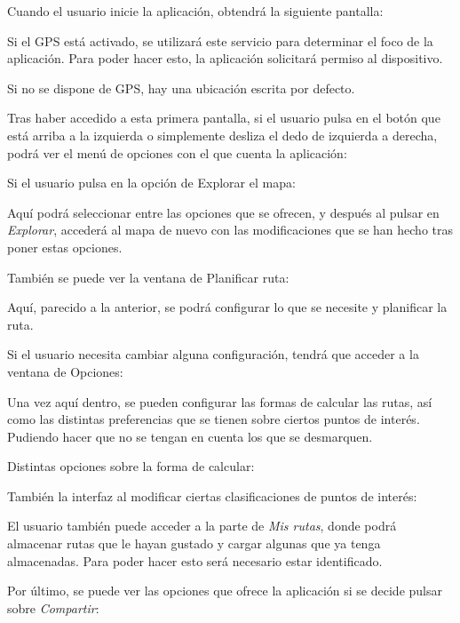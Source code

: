 Cuando el usuario inicie la aplicación, obtendrá la siguiente pantalla:


Si el GPS está activado, se utilizará este servicio para determinar el foco de la aplicación. Para poder hacer esto, la aplicación solicitará permiso al dispositivo.

Si no se dispone de GPS, hay una ubicación escrita por defecto.

Tras haber accedido a esta primera pantalla, si el usuario pulsa en el botón que está arriba a la izquierda o simplemente desliza el dedo de izquierda a derecha, podrá ver el menú de opciones con el que cuenta la aplicación:


Si el usuario pulsa en la opción de Explorar el mapa:


Aquí podrá seleccionar entre las opciones que se ofrecen, y después al pulsar en \textit{Explorar}, accederá al mapa de nuevo con las modificaciones que se han hecho tras poner estas opciones.

También se puede ver la ventana de Planificar ruta:


Aquí, parecido a la anterior, se podrá configurar lo que se necesite y planificar la ruta.

Si el usuario necesita cambiar alguna configuración, tendrá que acceder a la ventana de Opciones:


Una vez aquí dentro, se pueden configurar las formas de calcular las rutas, así como las distintas preferencias que se tienen sobre ciertos puntos de interés. Pudiendo hacer que no se tengan en cuenta los que se desmarquen.

Distintas opciones sobre la forma de calcular:


También la interfaz al modificar ciertas clasificaciones de puntos de interés:


El usuario también puede acceder a la parte de \textit{Mis rutas}, donde podrá almacenar rutas que le hayan gustado y cargar algunas que ya tenga almacenadas. Para poder hacer esto será necesario estar identificado.


Por último, se puede ver las opciones que ofrece la aplicación si se decide pulsar sobre \textit{Compartir}:

